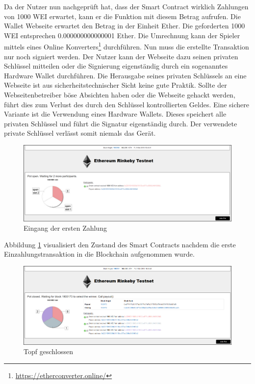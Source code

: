 Da der Nutzer nun nachgeprüft hat, dass der Smart Contract wirklich Zahlungen von 1000 WEI erwartet, kann er die  Funktion mit diesem Betrag aufrufen.
Die Wallet Webseite erwartet den Betrag in der Einheit Ether. Die geforderten 1000 WEI entsprechen 0.000000000000001 Ether. Die Umrechnung kann der Spieler mittels eines Online Konverters\footnote{\url{https://etherconverter.online/}} durchführen.
Nun muss die erstellte Transaktion nur noch signiert werden. Der Nutzer kann der Webseite dazu seinen privaten Schlüssel mitteilen oder die Signierung eigenständig durch ein sogenanntes Hardware Wallet durchführen. Die Herausgabe seines privaten Schlüssels an eine Webseite ist aus sicherheitstechnischer Sicht keine gute Praktik. Sollte der Webseitenbetreiber böse Absichten haben oder die Webseite gehackt werden, führt dies zum Verlust des durch den Schlüssel kontrollierten Geldes. Eine sichere Variante ist die Verwendung eines Hardware Wallets. Dieses speichert alle privaten Schlüssel und führt die Signatur eigenständig durch. Der verwendete private Schlüssel verlässt somit niemals das Gerät. 

\begin{figure}[H]
\centering
\includegraphics[width=1\linewidth]{Figures/eth_gui/ETH_pot_1}
\decoRule
\caption{Eingang der ersten Zahlung}
\label{fig:ETH_pot_1}
\end{figure}

Abbildung \ref{fig:ETH_pot_1} visualisiert den Zustand des Smart Contracts nachdem die erste Einzahlungstransaktion in die Blockchain aufgenommen wurde.

\begin{figure}[H]
\centering
\includegraphics[width=1\linewidth]{Figures/eth_gui/ETH_pot_closed}
\decoRule
\caption{Topf geschlossen}
\label{fig:ETH_pot_closed}
\end{figure}

